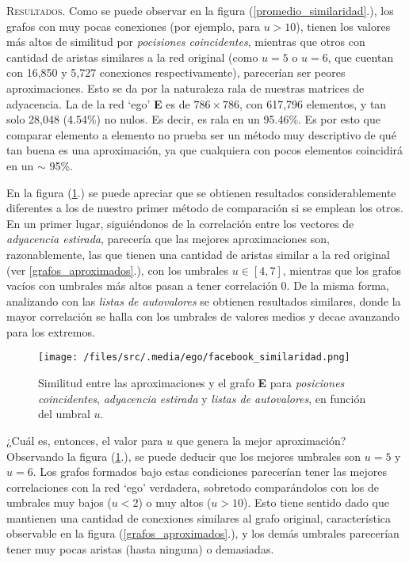 \vspace{1em}
\noindent \textsc{Resultados}. Como se puede observar en la figura (\ref{promedio_similaridad}.), los grafos con muy pocas conexiones (por ejemplo, para $u > 10$), tienen los valores más altos de similitud por \textit{pocisiones coincidentes}, mientras que otros con cantidad de aristas similares a la red original (como $u = 5$ o $u = 6$, que cuentan con 16,850 y 5,727 conexiones respectivamente), parecerían ser peores aproximaciones. Esto se da por la naturaleza rala de nuestras matrices de adyacencia. La de la red `ego' \textbf{E} es de $786 \times 786$, con 617,796 elementos, y tan solo 28,048 (4.54\%) no nulos. Es decir, es rala en un 95.46\%. Es por esto que comparar elemento a elemento no prueba ser un método muy descriptivo de qué tan buena es una aproximación, ya que cualquiera con pocos elementos coincidirá en un $\sim$ 95\%.

\vspace{1em}
En la figura (\ref{grafo_correlaciones}.) se puede apreciar que se obtienen resultados considerablemente diferentes a los de nuestro primer método de comparación si se emplean los otros. En un primer lugar, siguiéndonos de la correlación entre los vectores de \textit{adyacencia estirada}, parecería que las mejores aproximaciones son, razonablemente, las que tienen una cantidad de aristas similar a la red original (ver \ref{grafos_aproximados}.), con los umbrales $u \in [4,7]$, mientras que los grafos vacíos con umbrales más altos pasan a tener correlación 0. De la misma forma, analizando con las \textit{listas de autovalores} se obtienen resultados similares, donde la mayor correlación se halla con los umbrales de valores medios y decae avanzando para los extremos.  


\begin{figure}[!htbp]
\centering
\texttt{[image: /files/src/.media/ego/facebook\_similaridad.png]}
\caption{Similitud entre las aproximaciones y el grafo \textbf{E} para \textit{posiciones coincidentes}, \textit{adyacencia estirada} y \textit{listas de autovalores}, en función del umbral $u$.}
\label{grafo_correlaciones}
\end{figure}

\vspace{1em}
¿Cuál es, entonces, el valor para $u$ que genera la mejor aproximación? 
Observando la figura (\ref{grafo_correlaciones}.), se puede deducir que los mejores umbrales son $u = 5$ y $u = 6$. Los grafos formados bajo estas condiciones parecerían tener las mejores correlaciones con la red `ego' verdadera, sobretodo comparándolos con los de umbrales muy bajos ($u < 2$) o muy altos ($u > 10$). Esto tiene sentido dado que mantienen una cantidad de conexiones similares al grafo original, característica observable en la figura (\ref{grafos_aproximados}.), y los demás umbrales parecerían tener muy pocas aristas (hasta ninguna) o demasiadas.

